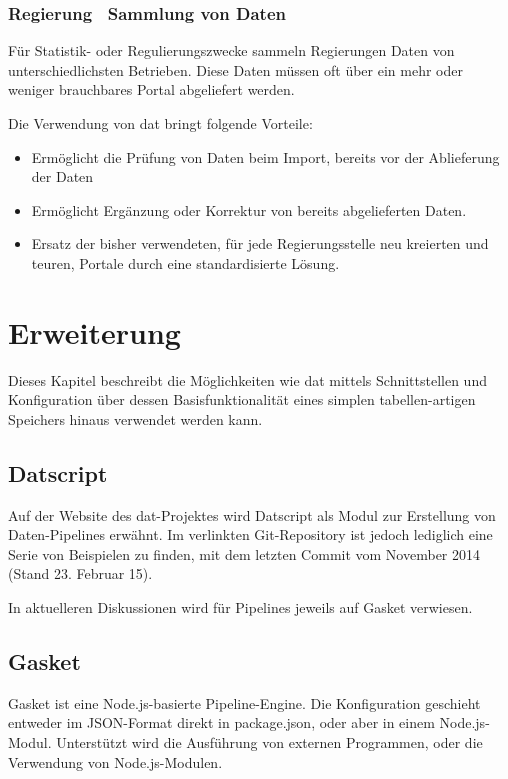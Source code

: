 \subsection{Regierung \textendash\ Sammlung von Daten} %
Für Statistik- oder Regulierungszwecke sammeln Regierungen Daten von unterschiedlichsten Betrieben. Diese Daten müssen oft über ein mehr oder weniger brauchbares Portal abgeliefert werden.

Die Verwendung von dat bringt folgende Vorteile:
\begin{itemize}
\item Ermöglicht die Prüfung von Daten beim Import, bereits vor der Ablieferung der Daten
\item Ermöglicht Ergänzung oder Korrektur von bereits abgelieferten Daten.
\item Ersatz der bisher verwendeten, für jede Regierungsstelle neu kreierten und teuren, Portale durch eine standardisierte Lösung.
\end{itemize}

\chapter{Erweiterung}

Dieses Kapitel beschreibt die Möglichkeiten wie \gls{dat} mittels Schnittstellen und Konfiguration über dessen Basisfunktionalität eines simplen tabellen-artigen Speichers hinaus verwendet werden kann.

\section{Datscript} %
Auf der Website des dat-Projektes wird Datscript als Modul zur Erstellung von Daten-Pipelines erwähnt. Im verlinkten Git-Repository ist jedoch lediglich eine Serie von Beispielen zu finden, mit dem letzten Commit vom November 2014 (Stand 23. Februar 15).

In aktuelleren Diskussionen wird für Pipelines jeweils auf Gasket verwiesen.

\section{Gasket} %
Gasket ist eine Node.js-basierte Pipeline-Engine. Die Konfiguration geschieht entweder im JSON-Format direkt in package.json, oder aber in einem Node.js-Modul. Unterstützt wird die Ausführung von externen Programmen, oder die Verwendung von Node.js-Modulen.

